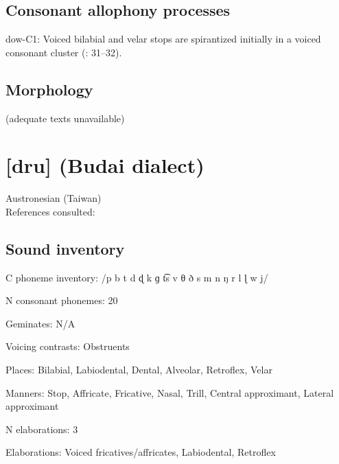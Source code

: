 {\subsection*{Consonant allophony processes}
\begin{appendixdesc}

\item[dow-C1:] Voiced bilabial and velar stops are spirantized initially in a voiced consonant cluster (\citealt{WieringWiering1994}: 31--32).
\end{appendixdesc}
\subsection*{Morphology}

(adequate texts unavailable)

\section*{[dru]  (Budai dialect)}   %
Austronesian (Taiwan)\medskip\\
References consulted: \citet{Chen2006}

\subsection*{Sound inventory}
\begin{appendixdesc}

\item[C phoneme inventory:] /p b t d ɖ k ɡ t͡s v θ ð s m n ŋ r l ɭ w j/

\item[N consonant phonemes:] 20

\item[Geminates:] N/A

\item[Voicing contrasts:] Obstruents

\item[Places:] Bilabial, Labiodental, Dental, Alveolar, Retroflex, Velar

\item[Manners:] Stop, Affricate, Fricative, Nasal, Trill, Central approximant, Lateral approximant

\item[N elaborations:] 3

\item[Elaborations:] Voiced fricatives/affricates, Labiodental, Retroflex


\end{appendixdesc}}
